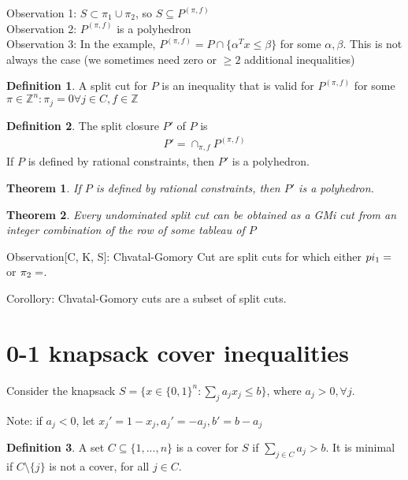 \documentclass{article}
\theoremstyle{plain}
\newtheorem{thm}{Theorem}
\theoremstyle{definition}
\newtheorem{defn}{Definition}
\begin{document}
Observation 1: $S\subset \pi_1 \cup \pi_2$, so $S\subseteq P^{(\pi, f)}$\\
Observation 2: $P^{(\pi, f)}$ is a polyhedron\\
Observation 3: In the example, $P^{(\pi, f)} = P \cap \{\alpha^Tx \leq \beta\}$ for
some $\alpha, \beta$. This is not always the case (we sometimes need zero or $\geq 2$
additional inequalities)

\begin{defn}
    A split cut for $P$ is an inequality that is valid for $P^{(\pi, f)}$ for
    some $\pi\in\mathbb{Z}^n: \pi_j = 0 \forall j\in C, f\in\mathbb{Z}$
\end{defn}

\begin{defn}
    The split closure $P'$ of $P$ is
    \begin{align*}
        P' = \cap_{\pi, f}P^{(\pi, f)}
    \end{align*}
    If $P$ is defined by rational constraints, then $P'$ is a polyhedron.
\end{defn}

\begin{thm}
    If $P$ is defined by rational constraints, then $P'$ is a polyhedron.
\end{thm}

\begin{thm}
    Every undominated split cut can be obtained as a GMi cut from an integer combination
    of the row of some tableau of $P$
\end{thm}

Observation[C, K, S]: Chvatal-Gomory Cut are split cuts for which either
$pi_1 =\empty$ or $\pi_2 = \empty$.

Corollory: Chvatal-Gomory cuts are a subset of split cuts.

\section{0-1 knapsack cover inequalities}
Consider the knapsack $S = \{x\in\{0,1\}^n: \sum_j a_jx_j \leq b\}$, where
$a_j > 0, \forall j$.

Note: if $a_j < 0$, let $x_j' = 1 - x_j, a_j' = -a_j, b' = b-a_j$

\begin{defn}
    A set $C \subseteq \{1, ..., n\}$ is a cover for $S$ if $\sum_{j\in C}a_j > b$.
    It is minimal if $C\setminus \{j\}$ is not a cover, for all $j\in C$.
\end{defn}
\end{document}
